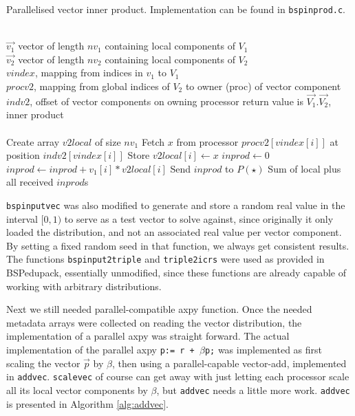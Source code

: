 \documentclass[a4paper]{article}
\newcommand{\ve}[1]{\ensuremath{\vec{#1}}}
\begin{document}
\begin{algorithm}
    \caption{Parallelised vector inner product. Implementation can be found in \texttt{bspinprod.c}.}
\label{alg:bspip}
\begin{algorithmic}
    \REQUIRE ~\\
             $\ve  {v_1}$ vector of length $nv_1$ containing local components of $V_1$\\
             $\ve  {v_2}$ vector of length $nv_2$ containing local components of $V_2$\\
             $vindex$, mapping from indices in $v_1$ to $V_1$\\
             $procv2$, mapping from global indices of $V_2$ to owner (proc) of vector component\\
             $indv2$, offset of vector components on owning processor
    \ENSURE  return value is $\ve{V_1}.\ve{V_2}$, inner product\\~\\
    \STATE Create array $v2local$ of size $nv_1$
    \STATE Fetch $x$ from processor $procv2[vindex[i]]$ at position $indv2[vindex[i]]$
    \STATE Store $v2local[i] \leftarrow x$
    \ENDFOR
    \STATE $inprod \leftarrow 0$
    \STATE $inprod \leftarrow inprod + v_1[i]*v2local[i]$
    \ENDFOR {}
    \STATE Send $inprod$ to $P(\star)$ 
    \RETURN Sum of local plus all received $inprod$s
\end{algorithmic}
\end{algorithm}

\texttt{bspinputvec} was also modified to generate and store a random real
value in the interval $[0,1)$ to serve as a test vector to solve against, since
    originally it only loaded the distribution, and not an associated real
    value per vector component. By setting a fixed random seed in that
    function, we always get consistent results. The functions
    \texttt{bspinput2triple} and \texttt{triple2icrs} were used as provided in
    BSPedupack, essentially unmodified, since these functions are already
    capable of working with arbitrary distributions.


Next we still needed parallel-compatible axpy function. Once the needed metadata arrays
were collected on reading the vector distribution, the implementation of a parallel axpy
was straight forward.
The actual implementation of the parallel axpy \texttt{p:= r + $\beta$p;} was implemented
as first scaling the vector \ve p by $\beta$, then using a parallel-capable vector-add,
implemented in \texttt{addvec}.
\texttt{scalevec} of course can get away with just letting each processor scale all its local
vector components by $\beta$, but \texttt{addvec} needs a little more work. 
\texttt{addvec} is presented in Algorithm \ref{alg:addvec}.
\end{document}
